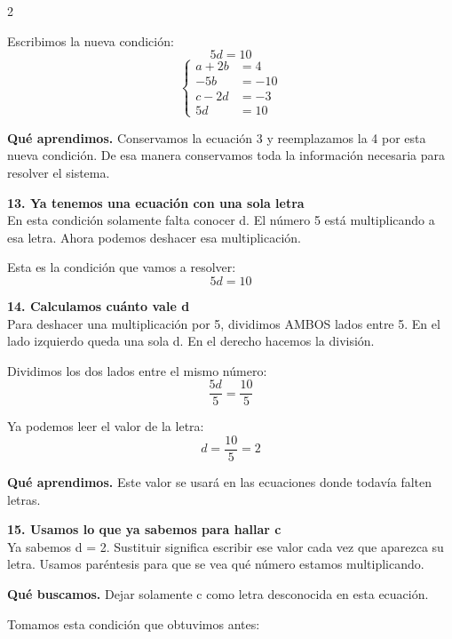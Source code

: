 \documentclass[11pt,a4paper,landscape]{article}
\begin{document}
\begin{multicols*}{2}
\begin{minipage}{\linewidth}
\par\smallskip Escribimos la nueva condición:
\[5d = 10\]
\[\left\{\begin{aligned}a + 2b &= 4\\-5b &= -10\\c - 2d &= -3\\5d &= 10\end{aligned}\right.\]
\par\smallskip\textbf{Qué aprendimos.} Conservamos la ecuación 3 y reemplazamos la 4 por esta nueva condición. De esa manera conservamos toda la información necesaria para resolver el sistema.
\end{minipage}\par\medskip
\noindent\begin{minipage}{\linewidth}\textbf{13. Ya tenemos una ecuación con una sola letra}\\[2pt]En esta condición solamente falta conocer d. El número 5 está multiplicando a esa letra. Ahora podemos deshacer esa multiplicación.
\par\smallskip Esta es la condición que vamos a resolver:
\[5d = 10\]
\end{minipage}\par\medskip
\noindent\begin{minipage}{\linewidth}\textbf{14. Calculamos cuánto vale d}\\[2pt]Para deshacer una multiplicación por 5, dividimos AMBOS lados entre 5. En el lado izquierdo queda una sola d. En el derecho hacemos la división.
\par\smallskip Dividimos los dos lados entre el mismo número:
\[\frac{5d}{5}=\frac{10}{5}\]
\par\smallskip Ya podemos leer el valor de la letra:
\[d=\frac{10}{5}=2\]
\par\smallskip\textbf{Qué aprendimos.} Este valor se usará en las ecuaciones donde todavía falten letras.
\end{minipage}\par\medskip
\noindent\begin{minipage}{\linewidth}\textbf{15. Usamos lo que ya sabemos para hallar c}\\[2pt]Ya sabemos d = 2. Sustituir significa escribir ese valor cada vez que aparezca su letra. Usamos paréntesis para que se vea qué número estamos multiplicando.
\par\smallskip\textbf{Qué buscamos.} Dejar solamente c como letra desconocida en esta ecuación.
\par\smallskip Tomamos esta condición que obtuvimos antes:

\end{minipage}
\end{multicols*}
\end{document}
